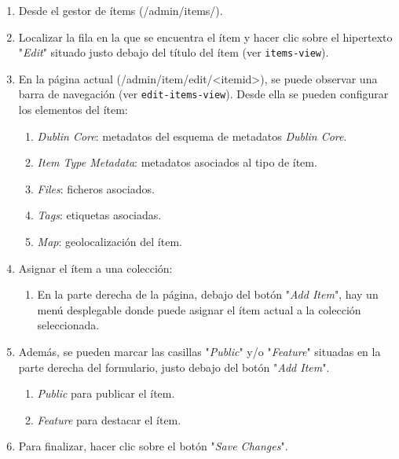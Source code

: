\documentclass[
]{article}
\providecommand{\tightlist}{%
  \setlength{\itemsep}{0pt}\setlength{\parskip}{0pt}}
\begin{document}
\begin{enumerate}
\def\labelenumi{\arabic{enumi}.}
\tightlist
\item
  Desde el gestor de ítems ({/admin/items/}).
\item
  Localizar la fila en la que se encuentra el ítem y hacer clic sobre el
  hipertexto "\emph{Edit}" situado justo debajo del título del ítem (ver
  \texttt{items-view}).
\item
  En la página actual
  ({/admin/item/edit/\textless itemid\textgreater{}}), se puede observar
  una barra de navegación (ver \texttt{edit-items-view}). Desde ella se
  pueden configurar los elementos del ítem:

  \begin{enumerate}
  \def\labelenumii{\alph{enumii}.}
  \tightlist
  \item
    \emph{Dublin Core}: metadatos del esquema de metadatos \emph{Dublin
    Core}.
  \item
    \emph{Item Type Metadata}: metadatos asociados al tipo de ítem.
  \item
    \emph{Files}: ficheros asociados.
  \item
    \emph{Tags}: etiquetas asociadas.
  \item
    \emph{Map}: geolocalización del ítem.
  \end{enumerate}
\item
  Asignar el ítem a una colección:

  \begin{enumerate}
  \def\labelenumii{\alph{enumii}.}
  \tightlist
  \item
    En la parte derecha de la página, debajo del botón "\emph{Add
    Item}", hay un menú desplegable donde puede asignar el ítem actual a
    la colección seleccionada.
  \end{enumerate}
\item
  Además, se pueden marcar las casillas "\emph{Public}" y/o
  "\emph{Feature}" situadas en la parte derecha del formulario, justo
  debajo del botón "\emph{Add Item}".

  \begin{enumerate}
  \def\labelenumii{\alph{enumii}.}
  \tightlist
  \item
    \emph{Public} para publicar el ítem.
  \item
    \emph{Feature} para destacar el ítem.
  \end{enumerate}
\item
  Para finalizar, hacer clic sobre el botón "\emph{Save Changes}".
\end{enumerate}
\end{document}
